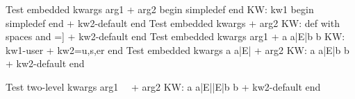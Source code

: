 \documentclass{article}
\author{Macro Kwarg Test}
\begin{document}
	Test embedded kwargs arg1 + arg2 begin simpledef end KW: kw1 begin simpledef end + kw2-default end
	Test embedded kwargs \randommacro{} + arg2 KW: def with spaces and =]{} + kw2-default end
	Test embedded kwargs arg1 + a a|E|b b KW: kw1-user + {kw2=u,s,er} end
	Test embedded kwargs a a|E|\test{}{} + arg2 KW: a a|E|b b + kw2-default end

	Test two-level kwargs arg1 \ \ + arg2 KW: a a|E|\test{}{}|E|b b + kw2-default end
\end{document}
